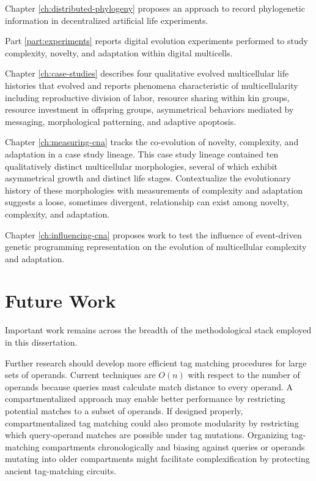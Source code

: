Chapter \ref{ch:distributed-phylogeny} proposes an approach to record phylogenetic information in decentralized artificial life experiments.

Part \ref{part:experiments} reports digital evolution experiments performed to study complexity, novelty, and adaptation within digital multicells.

Chapter \ref{ch:case-studies} describes four qualitative evolved multicellular life histories that evolved and reports phenomena characteristic of multicellularity including reproductive division of labor, resource sharing within kin groups, resource investment in offspring groups, asymmetrical behaviors mediated by messaging, morphological patterning, and adaptive apoptosis.

\item Chapter \ref{ch:measuring-cna} tracks the co-evolution of novelty, complexity, and adaptation in a case study lineage.
This case study lineage contained ten qualitatively distinct multicellular morphologies, several of which exhibit asymmetrical growth and distinct life stages.
Contextualize the evolutionary history of these morphologies with measurements of complexity and adaptation suggests a loose, sometimes divergent, relationship can exist among novelty, complexity, and adaptation.

Chapter \ref{ch:influencing-cna} proposes work to test the influence of event-driven genetic programming representation on the evolution of multicellular complexity and adaptation.


\section{Future Work}

Important work remains across the breadth of the methodological stack employed in this dissertation.

Further research should develop more efficient tag matching procedures for large sets of operands.
Current techniques are $O(n)$ with respect to the number of operands because queries must calculate match distance to every operand.
A compartmentalized approach may enable better performance by restricting potential matches to a subset of operands.
If designed properly, compartmentalized tag matching could also promote modularity by restricting which query-operand matches are possible under tag mutations.
Organizing tag-matching compartments chronologically and biasing against queries or operands mutating into older compartments might facilitate complexification by protecting ancient tag-matching circuits.

